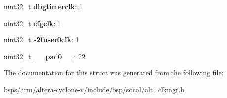 \begin{DoxyCompactItemize}
uint32\+\_\+t {\bfseries dbgtimerclk}\+: 1
\item 
\mbox{\label{structALT__CLKMGR__MAINPLL__EN__s_aca8e28b33970e8ab76f0f659c0ff27ac}} 
uint32\+\_\+t {\bfseries cfgclk}\+: 1
\item 
\mbox{\label{structALT__CLKMGR__MAINPLL__EN__s_ae65e751c25e04013760dc720892561c8}} 
uint32\+\_\+t {\bfseries s2fuser0clk}\+: 1
\item 
\mbox{\label{structALT__CLKMGR__MAINPLL__EN__s_a5a1ba88e7d5af5c93cad88aa6459bfa1}} 
uint32\+\_\+t {\bfseries \+\_\+\+\_\+pad0\+\_\+\+\_\+}\+: 22
\end{DoxyCompactItemize}


The documentation for this struct was generated from the following file\+:\begin{DoxyCompactItemize}
\item 
bsps/arm/altera-\/cyclone-\/v/include/bsp/socal/\mbox{\hyperlink{alt__clkmgr_8h}{alt\+\_\+clkmgr.\+h}}\end{DoxyCompactItemize}
